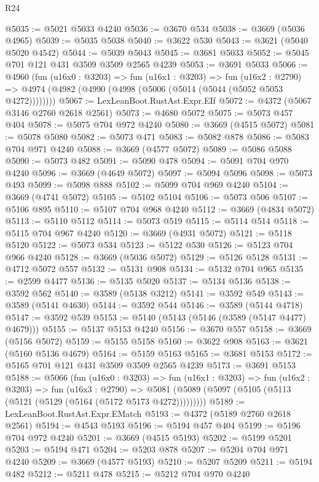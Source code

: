 \begin{lexlean}{R24}
\begin{coremodule}
@5035 := @5021 @5033 @4240
@5036 := @3670 @534
@5038 := @3669 (@5036 @4965)
@5039 := @5035 @5038
@5040 := @3622 @530
@5043 := @3621 (@5040 @5020 @4542)
@5044 := @5039 @5043
@5045 := @3681 @5033
@5052 := @5045 @701 @121 @431 @3509 @3509 @2565 @4239
@5053 := @3691 @5033
@5066 := @4960
    (fun (u16x0 : @3203) =>
    fun (u16x1 : @3203) =>
    fun (u16x2 : @2790) =>
    @4974 (@4982 (@4990 (@4998 (@5006 (@5014 (@5044 (@5052 @5053 @4272))))))))
@5067 := LexLeanBoot.RustAst.Expr.EIf
@5072 := @4372 (@5067 @3146 @2760 @2618 @2561)
@5073 := @4680 @5072
@5075 := @5073 @457 @404
@5078 := @5075 @704 @972 @4240
@5080 := @3669 (@4515 @5072)
@5081 := @5078 @5080
@5082 := @5073 @471
@5083 := @5082 @878
@5086 := @5083 @704 @971 @4240
@5088 := @3669 (@4577 @5072)
@5089 := @5086 @5088
@5090 := @5073 @482
@5091 := @5090 @478
@5094 := @5091 @704 @970 @4240
@5096 := @3669 (@4649 @5072)
@5097 := @5094 @5096
@5098 := @5073 @493
@5099 := @5098 @888
@5102 := @5099 @704 @969 @4240
@5104 := @3669 (@4741 @5072)
@5105 := @5102 @5104
@5106 := @5073 @506
@5107 := @5106 @895
@5110 := @5107 @704 @968 @4240
@5112 := @3669 (@4834 @5072)
@5113 := @5110 @5112
@5114 := @5073 @519
@5115 := @5114 @514
@5118 := @5115 @704 @967 @4240
@5120 := @3669 (@4931 @5072)
@5121 := @5118 @5120
@5122 := @5073 @534
@5123 := @5122 @530
@5126 := @5123 @704 @966 @4240
@5128 := @3669 (@5036 @5072)
@5129 := @5126 @5128
@5131 := @4712 @5072 @557
@5132 := @5131 @908
@5134 := @5132 @704 @965
@5135 := @2599 @4477
@5136 := @5135 @5020
@5137 := @5134 @5136
@5138 := @3592 @562
@5140 := @3589 (@5138 @3212)
@5141 := @3592 @549
@5143 := @3589 (@5141 @4630)
@5144 := @3592 @544
@5146 := @3589 (@5144 @4718)
@5147 := @3592 @539
@5153 := @5140 (@5143 (@5146 (@3589 (@5147 @4477) @4679)))
@5155 := @5137 @5153 @4240
@5156 := @3670 @557
@5158 := @3669 (@5156 @5072)
@5159 := @5155 @5158
@5160 := @3622 @908
@5163 := @3621 (@5160 @5136 @4679)
@5164 := @5159 @5163
@5165 := @3681 @5153
@5172 := @5165 @701 @121 @431 @3509 @3509 @2565 @4239
@5173 := @3691 @5153
@5188 := @5066
    (fun (u16x0 : @3203) =>
    fun (u16x1 : @3203) =>
    fun (u16x2 : @3203) =>
    fun (u16x3 : @2790) =>
    @5081 (@5089 (@5097 (@5105 (@5113 (@5121 (@5129 (@5164 (@5172 @5173 @4272)))))))))
@5189 := LexLeanBoot.RustAst.Expr.EMatch
@5193 := @4372 (@5189 @2760 @2618 @2561)
@5194 := @4543 @5193
@5196 := @5194 @457 @404
@5199 := @5196 @704 @972 @4240
@5201 := @3669 (@4515 @5193)
@5202 := @5199 @5201
@5203 := @5194 @471
@5204 := @5203 @878
@5207 := @5204 @704 @971 @4240
@5209 := @3669 (@4577 @5193)
@5210 := @5207 @5209
@5211 := @5194 @482
@5212 := @5211 @478
@5215 := @5212 @704 @970 @4240

\end{coremodule}
\end{lexlean}
